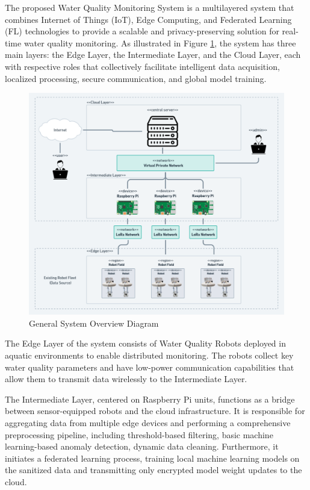 The proposed Water Quality Monitoring System is a multilayered system that combines Internet of Things (IoT), Edge Computing, and Federated Learning (FL) technologies to provide a scalable and privacy-preserving solution for real-time water quality monitoring. As illustrated in Figure \ref{fig:system_architecture_high_level_overview}, the system has three main layers: the Edge Layer, the Intermediate Layer, and the Cloud Layer, each with respective roles that collectively facilitate intelligent data acquisition, localized processing, secure communication, and global model training.

\begin{figure}[H]
    \centering
    \includegraphics[width=0.75\linewidth]{Figures/system_architecture.png}
    \caption{General System Overview Diagram} %
    \label{fig:system_architecture_high_level_overview} %
\end{figure}

The Edge Layer of the system consists of Water Quality Robots deployed in aquatic environments to enable distributed monitoring. The robots collect key water quality parameters and have low-power communication capabilities that allow them to transmit data wirelessly to the Intermediate Layer.

The Intermediate Layer, centered on Raspberry Pi units, functions as a bridge between sensor-equipped robots and the cloud infrastructure. It is responsible for aggregating data from multiple edge devices and performing a comprehensive preprocessing pipeline, including threshold-based filtering, basic machine learning-based anomaly detection, dynamic data cleaning. Furthermore, it initiates a federated learning process, training local machine learning models on the sanitized data and transmitting only encrypted model weight updates to the cloud.

